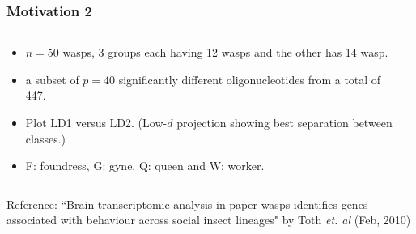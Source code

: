 \documentclass{beamer}
\begin{document}
\begin{frame}
     \frametitle{Motivation 2 }
	\begin{columns}
		\begin{column}{0.4\textwidth}
		  \begin{itemize}
		   \item $n=50$ wasps, 3 groups each having 12 wasps and the other has 14 wasp.

			  \item a subset of $p=40$ significantly different oligonucleotides from a total of 447.
			                                       \item Plot LD1 versus LD2. (Low-$d$ projection showing best separation between classes.)
			 \item F: foundress, G: gyne, Q: queen and W: worker.
		  \end{itemize}		
			
		\end{column}
		
		\begin{column}{0.6\textwidth}
			\begin{center}  \end{center}
		\end{column}
	\end{columns} 
\vspace{0.05cm}

	\tiny{ Reference: ``Brain transcriptomic analysis in paper wasps identifies genes associated with behaviour across social insect lineages" by Toth {\em et. al} (Feb, 2010)}
	
\end{frame}
\end{document}
